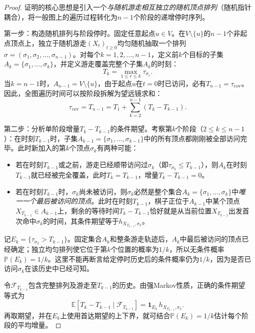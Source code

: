 \begin{proof}
证明的核心思想是引入一个\emph{与随机游走相互独立的随机顶点排列}（随机指针耦合），将一般图上的遍历过程转化为$n-1$个阶段的递增停时序列。

第一步：构造随机排列与阶段停时。固定任意起点$u\in V$。在$V\setminus\{u\}$的$n-1$个非起点顶点上，独立于随机游走$(X_t)_{t\geq 0}$均匀随机抽取一个排列$\sigma=(\sigma_1,\sigma_2,\ldots,\sigma_{n-1})$。对每个$k=1,2,\ldots,n-1$，定义前$k$个目标的子集$A_k=\{\sigma_1,\ldots,\sigma_k\}$，并定义游走覆盖完整个子集$A_k$的时刻：
\[
  T_k = \max_{1\leq r\leq k}\tau_{\sigma_r}.
\]
当$k=n-1$时，$A_{n-1}=V\setminus\{u\}$，由于起点$u$在$t=0$时已访问，必有$T_{n-1}=\tau_{\mathrm{cov}}$。因此，全图遍历时间可以按阶段拆解为望远镜求和：
\begin{equation}
  \tau_{\mathrm{cov}} = T_{n-1} = T_1 + \sum_{k=2}^{n-1}(T_k - T_{k-1}).
  \label{eq:matthews-telescoping}
\end{equation}

第二步：分析单阶段增量$T_k-T_{k-1}$的条件期望。考察第$k$个阶段（$2\leq k\leq n-1$）：在时刻$T_{k-1}$时，子集$A_{k-1}=\{\sigma_1,\ldots,\sigma_{k-1}\}$中的所有顶点都刚刚被全部访问完毕。此时新加入的第$k$个顶点$\sigma_k$有两种可能：
\begin{itemize}
\item 若在时刻$T_{k-1}$或之前，游走已经顺带访问过$\sigma_k$（即$\tau_{\sigma_k}\leq T_{k-1}$），则$A_k$在时刻$T_{k-1}$就已经被完全覆盖，此时$T_k=T_{k-1}$，增量$T_k-T_{k-1}=0$。
\item 若在时刻$T_{k-1}$时，$\sigma_k$尚未被访问，则$\sigma_k$必然是整个集合$A_k=\{\sigma_1,\ldots,\sigma_k\}$中\emph{唯一一个最后被访问的顶点}。此时在时刻$T_{k-1}$，棋子正位于$A_{k-1}$中某个顶点$X_{T_{k-1}}\in A_{k-1}$上，剩余的等待时间$T_k-T_{k-1}$恰好就是从当前位置$X_{T_{k-1}}$出发首次命中$\sigma_k$的时间，其条件期望等于$h_{X_{T_{k-1}},\sigma_k}$。
\end{itemize}

记$E_k=\{\tau_{\sigma_k}>T_{k-1}\}$。固定集合$A_k$和整条游走轨迹后，$A_k$中最后被访问的顶点已经确定；独立均匀排列使它位于第$k$个位置的概率为$1/k$，所以无条件概率$\mathbb P(E_k)=1/k$。这里不能再断言给定停时历史后的条件概率仍为$1/k$，因为是否已访问$\sigma_k$在该历史中已经可知。

令$\mathcal F_{T_{k-1}}$包含完整排列及游走至$T_{k-1}$的历史。由强Markov性质，正确的条件期望等式为
\begin{equation}
  \mathbb E[T_k-T_{k-1}\mid\mathcal F_{T_{k-1}}]
  =\mathbf1_{E_k}\,h_{X_{T_{k-1}},\sigma_k}.
  \label{eq:matthews-conditional-increment}
\end{equation}
再取期望，并在$E_k$上使用首达期望的上下界，就可结合$\mathbb P(E_k)=1/k$估计每个阶段的平均增量。


\end{proof}
